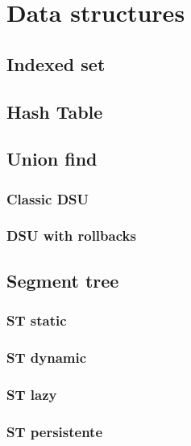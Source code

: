 \newpage
\section{Data structures}

\subsection{Indexed set}


\subsection{Hash Table}


\subsection{Union find}
\subsubsection{Classic DSU}

\newpage
\subsubsection{DSU with rollbacks}


\newpage
\subsection{Segment tree}
\subsubsection{ST static}

\subsubsection{ST dynamic}

\subsubsection{ST lazy}

\subsubsection{ST persistente}

\newpage

